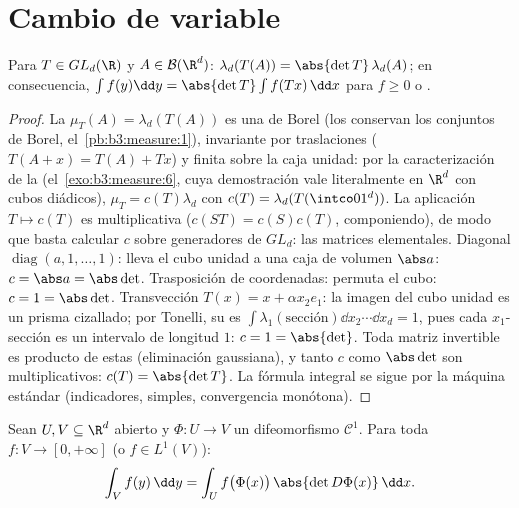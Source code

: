 \section{Cambio de variable}

\begin{theorem}
\label{thm:b3:product:linearchange}
Para $T \in GL_d(\R)$ y $A \in \mathcal B(\R^d)$:
$\lambda_d(T(A)) = \abs{\det T}\,\lambda_d(A)$; en consecuencia,
$\int f(y)\dd y = \abs{\det T}\int f(Tx)\,\dd x$ para $f \geq 0$ o
.
\end{theorem}

\begin{proof}
La  $\mu_T(A) = \lambda_d(T(A))$
es una  de Borel (los
 conservan los
conjuntos de Borel, el~\cref{pb:b3:measure:1}), invariante por
traslaciones ($T(A + x) = T(A) + Tx$) y finita sobre la caja unidad: por
la caracterización de la  (el~\cref{exo:b3:measure:6}, cuya demostración vale
literalmente en $\R^d$ con cubos diádicos), $\mu_T = c(T)\lambda_d$ con
$c(T)
= \lambda_d(T(\intco01^d))$. La aplicación $T \mapsto c(T)$ es
multiplicativa ($c(ST) = c(S)c(T)$, componiendo), de modo que basta
calcular $c$ sobre generadores de $GL_d$: las matrices elementales.
Diagonal $\operatorname{diag}(a, 1, \dots, 1)$: lleva el cubo unidad a
una caja de volumen $\abs a$: $c = \abs a =
\abs\det$. Trasposición de coordenadas: permuta el cubo: $c
= 1 = \abs\det$. Transvección $T(x) = x + \alpha
x_2e_1$: la imagen del cubo unidad es un prisma cizallado; por Tonelli,
su  es
$\int\lambda_1(\text{sección})\dd x_2
\cdots \dd x_d = 1$, pues cada $x_1$-sección es un intervalo de longitud
$1$: $c = 1 = \abs{\det}$. Toda matriz invertible es producto de estas
(eliminación gaussiana), y tanto $c$ como $\abs\det$ son
multiplicativos: $c(T) = \abs{\det T}$. La fórmula integral se sigue por
la máquina estándar (indicadores, simples, convergencia monótona).
\end{proof}

\begin{theorem}\label{thm:b3:product:changeofvar}
Sean $U, V \subseteq \R^d$ abierto y $\Phi \colon U \to V$ un
difeomorfismo $\mathcal C^1$. Para toda $f \colon V
\to [0, +\infty]$  (o
$f \in L^1(V)$):
\[
\int_V f(y)\,\dd y = \int_U
f\bigl(\Phi(x)\bigr)\,\abs{\det D\Phi(x)}\,\dd x .
\]
\end{theorem}

